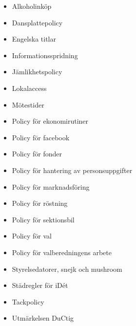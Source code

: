 \documentclass[]{dsekprotokoll}
\begin{document}
\begin{itemize}
    \item Alkoholinköp
    \item Dansplattepolicy
    \item Engelska titlar
    \item Informationsspridning
    \item Jämlikhetspolicy
    \item Lokalaccess
    \item Mötestider
    \item Policy för ekonomirutiner
    \item Policy för facebook
    \item Policy för fonder
    \item Policy för hantering av personsuppgifter
    \item Policy för marknadsföring
    \item Policy för röstning
    \item Policy för sektionsbil
    \item Policy för val
    \item Policy för valberedningens arbete
    \item Styrelsedatorer, snejk och mushroom
    \item Städregler för iDét
    \item Tackpolicy
    \item Utmärkelsen DuCtig
\end{itemize}
\end{document}
